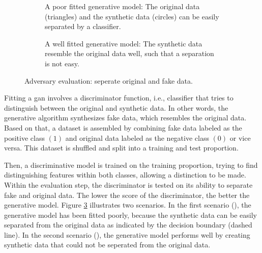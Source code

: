 \documentclass[../../main.tex]{subfiles}
\begin{document}
 \begin{figure}[t!]%
    \centering%
    \begin{subfigure}[b]{0.49\textwidth}%
        \centering\captionsetup{width=.8\linewidth}%
        \caption{A poor fitted generative model: The original data (triangles) and the synthetic data (circles) can be easily separated by a classifier.}%
        \label{subfig:adversary_evaluation_bad}%
    \end{subfigure}%
    \hfill%
    \begin{subfigure}[b]{0.49\textwidth}%
        \centering\captionsetup{width=.8\linewidth}%
        \caption{A well fitted generative model: The synthetic data resemble the original data well, such that a separation is not easy.}%
        \label{subfig:adversary_evaluation_good}%
    \end{subfigure}%
    \caption{Adversary evaluation: seperate original and fake data.}%
    \label{fig:adversary_evaluation}%
\end{figure}%

Fitting a \gls{gan} involves a discriminator function, i.e., classifier that tries to distinguish between the original and synthetic data. In other words, the generative algorithm synthesizes fake data, which resembles the original data. Based on that, a dataset is assembled by combining fake data labeled as the positive class $(1)$ and original data labeled as the negative class $(0)$ or vice versa. This dataset is shuffled and split into a training and test proportion.

Then, a discriminative model is trained on the training proportion, trying to find distinguishing features within both classes, allowing a distinction to be made. Within the evaluation step, the discriminator is tested on its ability to separate fake and original data. The lower the score of the discriminator, the better the generative model. Figure \ref{fig:adversary_evaluation} illustrates two scenarios. In the first scenario (), the generative model has been fitted poorly, because the synthetic data can be easily separated from the original data as indicated by the decision boundary (dashed line). In the second scenario (), the generative model performs well by creating synthetic data that could not be seperated from the original data. 
\end{document}
